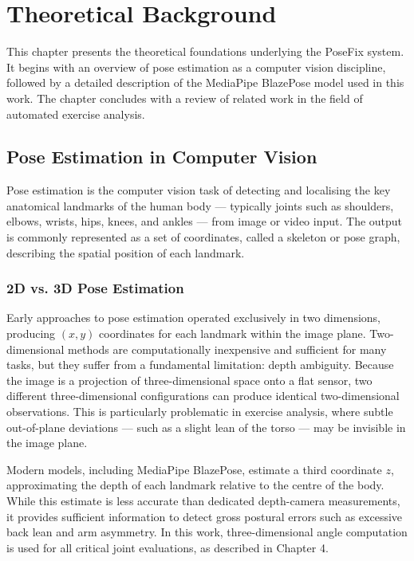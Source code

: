 \chapter{Theoretical Background}
\label{chap:theory}

This chapter presents the theoretical foundations underlying the PoseFix system. It begins with an overview of pose estimation as a computer vision discipline, followed by a detailed description of the MediaPipe BlazePose model used in this work. The chapter concludes with a review of related work in the field of automated exercise analysis.

\section{Pose Estimation in Computer Vision}
\label{sec:pose-estimation}

Pose estimation is the computer vision task of detecting and localising the key anatomical landmarks of the human body — typically joints such as shoulders, elbows, wrists, hips, knees, and ankles — from image or video input. The output is commonly represented as a set of coordinates, called a skeleton or pose graph, describing the spatial position of each landmark.

\subsection{2D vs. 3D Pose Estimation}
\label{subsec:2d-3d}

Early approaches to pose estimation operated exclusively in two dimensions, producing $(x, y)$ coordinates for each landmark within the image plane. Two-dimensional methods are computationally inexpensive and sufficient for many tasks, but they suffer from a fundamental limitation: depth ambiguity. Because the image is a projection of three-dimensional space onto a flat sensor, two different three-dimensional configurations can produce identical two-dimensional observations. This is particularly problematic in exercise analysis, where subtle out-of-plane deviations — such as a slight lean of the torso — may be invisible in the image plane.

Modern models, including MediaPipe BlazePose, estimate a third coordinate $z$, approximating the depth of each landmark relative to the centre of the body. While this estimate is less accurate than dedicated depth-camera measurements, it provides sufficient information to detect gross postural errors such as excessive back lean and arm asymmetry. In this work, three-dimensional angle computation is used for all critical joint evaluations, as described in Chapter 4.

